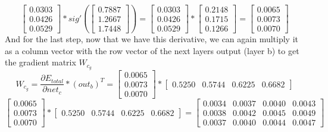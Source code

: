 \documentclass[11pt, halfparskip]{article}
\begin{document}
    \[
    	\begin{bmatrix}
    		0.0303\\
    		0.0426\\
    		0.0529
    	 \end{bmatrix}
    	 *
    	 sig'(
    	 \begin{bmatrix}
        		0.7887\\
        		1.2667\\
        		1.7448
        	\end{bmatrix}
        	) =
        	\begin{bmatrix}
    		0.0303\\
    		0.0426\\
    		0.0529
    	 \end{bmatrix}
    	 *
    	 \begin{bmatrix}
        		0.2148\\
        		0.1715\\
        		0.1266
        	\end{bmatrix}
        	=
        	\begin{bmatrix}
        		0.0065\\
        		0.0073\\
        		0.0070
        	\end{bmatrix}
    \]
    And for the last step, now that we have this derivative, we can again multiply it as a column vector with the row vector of the next layers output (layer b) to get the gradient matrix
    $W_{c_g}$
    \[
    	W_{c_g} = \frac{\partial E_{total}}{\partial net_c} * (out_b)^T = 
    	\begin{bmatrix}
        		0.0065\\
        		0.0073\\
        		0.0070
        	\end{bmatrix}
        	*
        	\begin{bmatrix}
        		0.5250 & 0.5744 & 0.6225 & 0.6682
        	\end{bmatrix}
    \]
    \[
    	\begin{bmatrix}
        		0.0065\\
        		0.0073\\
        		0.0070
        	\end{bmatrix}
        	*
        	\begin{bmatrix}
        		0.5250 & 0.5744 & 0.6225 & 0.6682
        	\end{bmatrix}
        	=
        	\begin{bmatrix}
        		0.0034 & 0.0037 & 0.0040 & 0.0043\\
        		0.0038 & 0.0042 & 0.0045 & 0.0049\\
        		0.0037 & 0.0040 & 0.0044 & 0.0047
        	\end{bmatrix}
    \]
\end{document}
